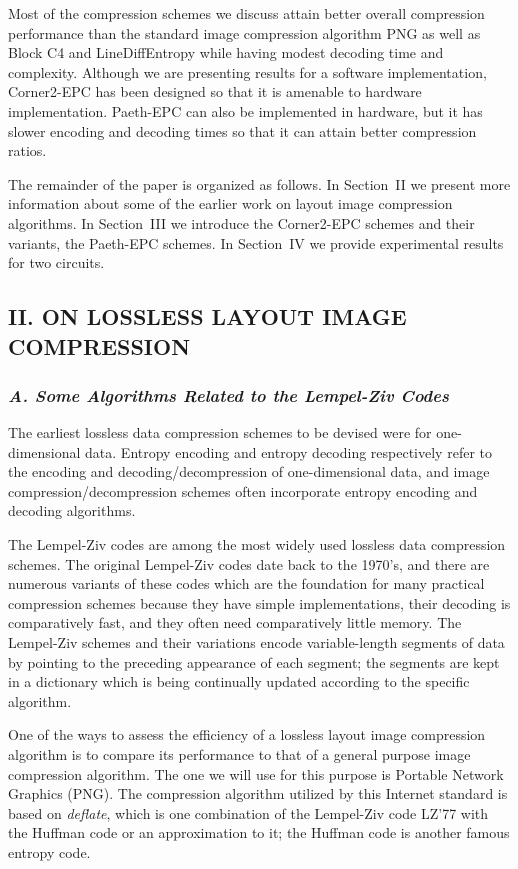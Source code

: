 \documentclass{article}
\begin{document}
Most of the compression schemes we discuss attain better
overall compression performance than the standard image compression algorithm
PNG as well as  Block C4 and LineDiffEntropy while having modest
decoding time and complexity.  Although we are presenting 
results for a software implementation, Corner2-EPC has been designed so that 
it is amenable to hardware implementation.  Paeth-EPC can also be implemented
in hardware, but it has slower encoding and decoding times so that it can
attain better compression ratios.

The remainder of the paper is organized as follows.  In Section~II we present
more information about some of the earlier work on layout image compression
algorithms.  In Section~III we introduce the Corner2-EPC schemes and their
variants, the Paeth-EPC schemes.
In Section~IV we provide experimental results for two circuits.

\subsection*{II. ON LOSSLESS LAYOUT IMAGE COMPRESSION}
\subsubsection*{{\em A. Some Algorithms Related to the Lempel-Ziv Codes}}
The earliest lossless data compression schemes to be devised were for
one-dimensional data.
Entropy encoding and entropy decoding respectively refer to the encoding 
and decoding/decompression of one-dimensional data, and
image compression/decompression schemes often incorporate
entropy encoding and decoding algorithms.  

The Lempel-Ziv codes are among the most widely used lossless data
compression schemes. 
The original Lempel-Ziv codes date back to the 1970's, and there 
are numerous variants of these codes which are the foundation
for many practical compression schemes because they have simple 
implementations, their decoding is comparatively fast, and they often need 
comparatively little memory.  
The Lempel-Ziv schemes and their variations encode
variable-length segments of data by pointing to the preceding appearance of
each segment; the segments are kept in a dictionary which is being continually
updated according to the specific algorithm.  

One of the ways to assess the efficiency of a lossless layout image
compression algorithm is to compare its performance to that of a general
purpose image compression algorithm.  The one we will use for this purpose
is Portable Network Graphics (PNG).  The compression algorithm
utilized by this Internet standard is based on {\it deflate},
which is one combination of the Lempel-Ziv code LZ'77 with the
Huffman code or an approximation to it; the Huffman code is another 
famous entropy code.
\end{document}
